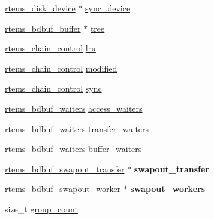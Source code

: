 \begin{DoxyCompactItemize}
\item 
\mbox{\hyperlink{structrtems__disk__device}{rtems\+\_\+disk\+\_\+device}} $\ast$ \mbox{\hyperlink{structrtems__bdbuf__cache_a0c9284c86a858aa8e10e17aba3ed5e3e}{sync\+\_\+device}}
\item 
\mbox{\hyperlink{structrtems__bdbuf__buffer}{rtems\+\_\+bdbuf\+\_\+buffer}} $\ast$ \mbox{\hyperlink{structrtems__bdbuf__cache_a6ab293d43edc26f1151a8a6cb332f2fa}{tree}}
\item 
\mbox{\hyperlink{unionChain__Control}{rtems\+\_\+chain\+\_\+control}} \mbox{\hyperlink{structrtems__bdbuf__cache_aa75c3b85a8bafab5387fdb996e86f5b2}{lru}}
\item 
\mbox{\hyperlink{unionChain__Control}{rtems\+\_\+chain\+\_\+control}} \mbox{\hyperlink{structrtems__bdbuf__cache_added2dc3ed9b33576dec3a8a26d85cf0}{modified}}
\item 
\mbox{\hyperlink{unionChain__Control}{rtems\+\_\+chain\+\_\+control}} \mbox{\hyperlink{structrtems__bdbuf__cache_ac0d332460931dab2ef99e73ef49ebb30}{sync}}
\item 
\mbox{\hyperlink{structrtems__bdbuf__waiters}{rtems\+\_\+bdbuf\+\_\+waiters}} \mbox{\hyperlink{structrtems__bdbuf__cache_a57d4ce83f1e7aef1478c86e47565f912}{access\+\_\+waiters}}
\item 
\mbox{\hyperlink{structrtems__bdbuf__waiters}{rtems\+\_\+bdbuf\+\_\+waiters}} \mbox{\hyperlink{structrtems__bdbuf__cache_a0e9bf681a0c73201055cd2f1727a3bbc}{transfer\+\_\+waiters}}
\item 
\mbox{\hyperlink{structrtems__bdbuf__waiters}{rtems\+\_\+bdbuf\+\_\+waiters}} \mbox{\hyperlink{structrtems__bdbuf__cache_aef01ed3354d0b912a29ebd8942e567cb}{buffer\+\_\+waiters}}
\item 
\mbox{\label{structrtems__bdbuf__cache_a057397f12e736ceb40d7d7b0aade2308}} 
\mbox{\hyperlink{structrtems__bdbuf__swapout__transfer}{rtems\+\_\+bdbuf\+\_\+swapout\+\_\+transfer}} $\ast$ {\bfseries swapout\+\_\+transfer}
\item 
\mbox{\label{structrtems__bdbuf__cache_ab4c92f2f85bcd04c5f8ead82c242ef76}} 
\mbox{\hyperlink{structrtems__bdbuf__swapout__worker}{rtems\+\_\+bdbuf\+\_\+swapout\+\_\+worker}} $\ast$ {\bfseries swapout\+\_\+workers}
\item 
size\+\_\+t \mbox{\hyperlink{structrtems__bdbuf__cache_a02b4ce22cf985c361820bfdef1dff4ba}{group\+\_\+count}}
\item 

\end{DoxyCompactItemize}
